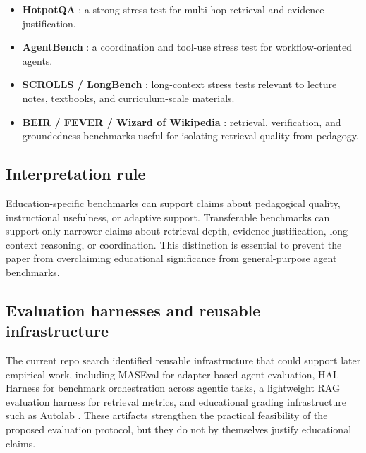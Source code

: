 \begin{itemize}[leftmargin=*]
    \item \textbf{HotpotQA} \cite{yang2018hotpotqa}: a strong stress test for multi-hop retrieval and evidence justification.
    \item \textbf{AgentBench} \cite{liu2023agentbench}: a coordination and tool-use stress test for workflow-oriented agents.
    \item \textbf{SCROLLS / LongBench} \cite{shaham2022scrolls,bai2024longbench2}: long-context stress tests relevant to lecture notes, textbooks, and curriculum-scale materials.
    \item \textbf{BEIR / FEVER / Wizard of Wikipedia} \cite{thakur2021beir,thorne2018fever,dinan2019wizard}: retrieval, verification, and groundedness benchmarks useful for isolating retrieval quality from pedagogy.
\end{itemize}

\subsection{Interpretation rule}

Education-specific benchmarks can support claims about pedagogical quality, instructional usefulness, or adaptive support. Transferable benchmarks can support only narrower claims about retrieval depth, evidence justification, long-context reasoning, or coordination. This distinction is essential to prevent the paper from overclaiming educational significance from general-purpose agent benchmarks.

\subsection{Evaluation harnesses and reusable infrastructure}

The current repo search identified reusable infrastructure that could support later empirical work, including MASEval for adapter-based agent evaluation, HAL Harness for benchmark orchestration across agentic tasks, a lightweight RAG evaluation harness for retrieval metrics, and educational grading infrastructure such as Autolab \cite{maseval2026,halharness2026,ragevalharness2026,autolab2024}. These artifacts strengthen the practical feasibility of the proposed evaluation protocol, but they do not by themselves justify educational claims.
